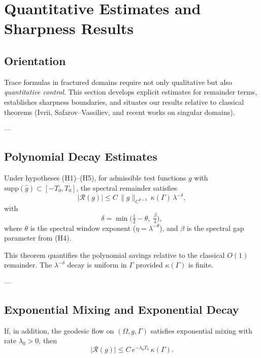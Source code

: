 \section{Quantitative Estimates and Sharpness Results}
\label{sec:quantitative-sharpness}

\subsection*{Orientation}
Trace formulas in fractured domains require not only qualitative 
but also \emph{quantitative control}.  
This section develops explicit estimates for remainder terms,  
establishes sharpness boundaries,  
and situates our results relative to classical theorems 
(Ivrii, Safarov–Vassiliev, and recent works on singular domains).  

---

\subsection{Polynomial Decay Estimates}

\begin{theorem}
\label{thm:poly-decay}
Under hypotheses (H1)--(H5), 
for admissible test functions $g$ with $\mathrm{supp}(\widehat{g}) \subset [-T_0, T_0]$,  
the spectral remainder satisfies
\[
|\mathcal{R}(g)| 
\leq C \, \|g\|_{C^{d+3}} \, \kappa(\Gamma) \, \lambda^{-\delta},
\]
with
\[
\delta = \min\Big(\tfrac{1}{2} - \theta,\; \tfrac{\beta}{4}\Big),
\]
where $\theta$ is the spectral window exponent ($\eta = \lambda^{-\theta}$),  
and $\beta$ is the spectral gap parameter from (H4).
\end{theorem}

\begin{remark}
This theorem quantifies the polynomial savings relative to the classical $O(1)$ remainder.  
The $\lambda^{-\delta}$ decay is uniform in $\Gamma$ provided $\kappa(\Gamma)$ is finite.  
\end{remark}

---

\subsection{Exponential Mixing and Exponential Decay}

\begin{theorem}
\label{thm:exp-decay}
If, in addition, the geodesic flow on $(\Omega,g,\Gamma)$ 
satisfies exponential mixing with rate $\lambda_0 > 0$,  
then
\[
|\mathcal{R}(g)| 
\leq C \, e^{-\lambda_0 T_0} \, \kappa(\Gamma).
\]
\end{theorem}

